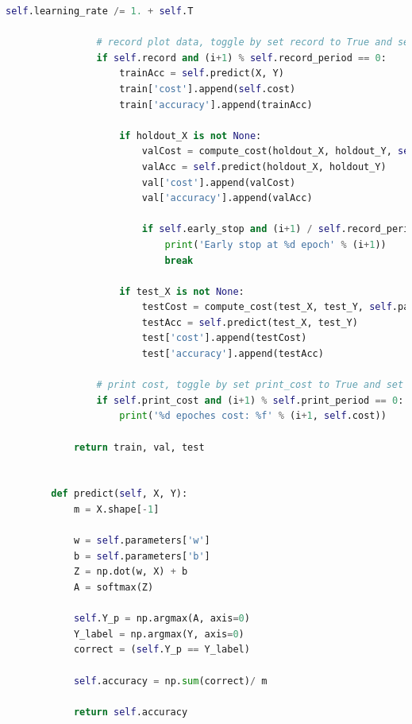 \documentclass{article}
\begin{document}
\begin{lstlisting}[language=Python, breaklines]
	            self.learning_rate /= 1. + self.T
	
	            # record plot data, toggle by set record to True and set record period
	            if self.record and (i+1) % self.record_period == 0:
	                trainAcc = self.predict(X, Y)
	                train['cost'].append(self.cost)
	                train['accuracy'].append(trainAcc)
	
	                if holdout_X is not None:
	                    valCost = compute_cost(holdout_X, holdout_Y, self.parameters['w'], self.parameters['b'], self.lambd, self.regularized)
	                    valAcc = self.predict(holdout_X, holdout_Y)
	                    val['cost'].append(valCost)
	                    val['accuracy'].append(valAcc)
	
	                    if self.early_stop and (i+1) / self.record_period > self.stop_step and strictly_increasing(val['cost'][-self.stop_step:]):
	                        print('Early stop at %d epoch' % (i+1))
	                        break
	
	                if test_X is not None:
	                    testCost = compute_cost(test_X, test_Y, self.parameters['w'], self.parameters['b'], self.lambd, self.regularized)
	                    testAcc = self.predict(test_X, test_Y)
	                    test['cost'].append(testCost)
	                    test['accuracy'].append(testAcc)
	
	            # print cost, toggle by set print_cost to True and set print period
	            if self.print_cost and (i+1) % self.print_period == 0:
	                print('%d epoches cost: %f' % (i+1, self.cost))
	
	        return train, val, test
	
	
	    def predict(self, X, Y):
	        m = X.shape[-1]
	
	        w = self.parameters['w']
	        b = self.parameters['b']
	        Z = np.dot(w, X) + b
	        A = softmax(Z)
	
	        self.Y_p = np.argmax(A, axis=0)
	        Y_label = np.argmax(Y, axis=0)
	        correct = (self.Y_p == Y_label)
	
	        self.accuracy = np.sum(correct)/ m
	
	        return self.accuracy
	
\end{lstlisting}
\newpage
\end{document}

